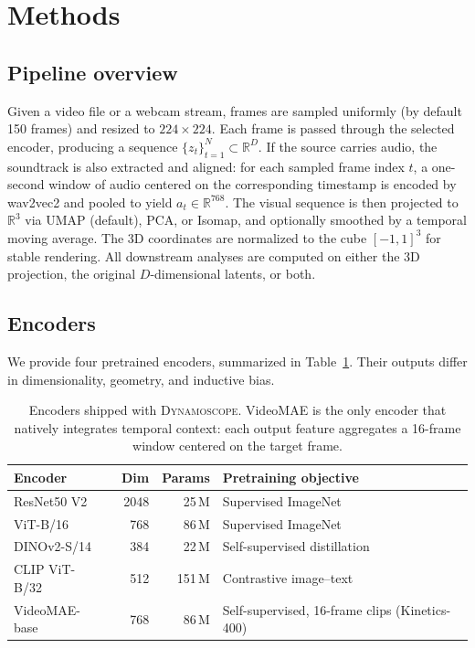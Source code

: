 \documentclass[11pt,a4paper]{article}
\begin{document}
\section{Methods}

\subsection{Pipeline overview}

Given a video file or a webcam stream, frames are sampled uniformly
(by default 150 frames) and resized to $224 \times 224$. Each frame
is passed through the selected encoder, producing a sequence
$\{z_t\}_{t=1}^N \subset \mathbb{R}^D$. If the source carries
audio, the soundtrack is also extracted and aligned: for each
sampled frame index $t$, a one-second window of audio centered on
the corresponding timestamp is encoded by wav2vec2 and pooled to
yield $a_t \in \mathbb{R}^{768}$. The visual sequence is then
projected to $\mathbb{R}^3$ via UMAP (default), PCA, or Isomap, and
optionally smoothed by a temporal moving average. The 3D
coordinates are normalized to the cube $[-1,1]^3$ for stable
rendering. All downstream analyses are computed on either the 3D
projection, the original $D$-dimensional latents, or both.

\subsection{Encoders}

We provide four pretrained encoders, summarized in
Table~\ref{tab:encoders}. Their outputs differ in dimensionality,
geometry, and inductive bias.

\begin{table}[ht]
\centering
\begin{tabular}{lrrl}
\toprule
Encoder & Dim & Params & Pretraining objective \\
\midrule
ResNet50 V2~\cite{he2016deep}    & 2048 & 25\,M  & Supervised ImageNet \\
ViT-B/16~\cite{dosovitskiy2020vit} & 768  & 86\,M  & Supervised ImageNet \\
DINOv2-S/14~\cite{oquab2023dinov2}& 384  & 22\,M  & Self-supervised distillation \\
CLIP ViT-B/32~\cite{radford2021clip} & 512  & 151\,M & Contrastive image--text \\
VideoMAE-base~\cite{tong2022videomae} & 768  & 86\,M  & Self-supervised, 16-frame clips (Kinetics-400) \\
\bottomrule
\end{tabular}
\caption{Encoders shipped with \textsc{Dynamoscope}. VideoMAE is the only
encoder that natively integrates temporal context: each output feature
aggregates a 16-frame window centered on the target frame.}
\label{tab:encoders}
\end{table}
\end{document}
